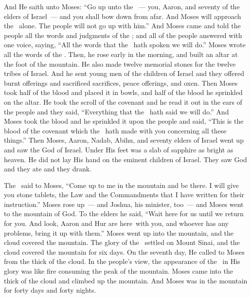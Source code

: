 
\begin{inparaenum}
   And He saith unto Moses: ``Go up unto the \lord~--- you, Aaron, and seventy of the elders of Israel~--- and you shall bow down from afar.%
   And Moses will approach the \lord\ alone. The people will not go up with him.''%
   And Moses came and told the people all the words and judgments of the \lord; and all of the people answered with one voice, saying, ``All the words that the \lord\ hath spoken we will do.''%
   Moses wrote all the words of the \lord. Then, he rose early in the morning, and built an altar at the foot of the mountain. He also made twelve memorial stones for the twelve tribes of Israel.%
   And he sent young men of the children of Israel and they offered burnt offerings and sacrificed sacrifices, peace offerings, and oxen.%
   Then Moses took half of the blood and placed it in bowls, and half of the blood he sprinkled on the altar.%
   He took the scroll of the covenant and he read it out in the ears of the people and they said, ``Everything that the \lord\ hath said we will do.''%
   And Moses took the blood and he sprinkled it upon the people and said, ``This is the blood of the covenant which the \lord\ hath made with you concerning all these things.''%
   Then Moses, Aaron, Nadab, Abihu, and seventy elders of Israel went up%
   and saw the God of Israel. Under His feet was a slab of sapphire as bright as heaven.%
   He did not lay His hand on the eminent children of Israel. They saw God and they ate and they drank.%

   The \lord\ said to Moses, ``Come up to me in the mountain and be there. I will give you stone tablets, the Law and the Commandments that I have written for their instruction.''%
   Moses rose up~--- and Joshua, his minister, too~--- and Moses went to the mountain of God.%
   To the elders he said, ``Wait here for us until we return for you. And look, Aaron and Hur are here\understood{}\ with you, and whoever has any problems, bring it up with them.''%
   Moses went up into the mountain, and the cloud covered the mountain.%
   The glory of the \lord\ settled on Mount Sinai, and the cloud covered the mountain for six days. On the seventh day, He called to Moses from the thick of the cloud.%
   In the people's view, the appearance of the \lord\ in His glory was like fire consuming the peak of the mountain.%
   Moses came into the thick of the cloud and climbed up the mountain. And Moses was in the mountain for forty days and forty nights.%
\end{inparaenum}
